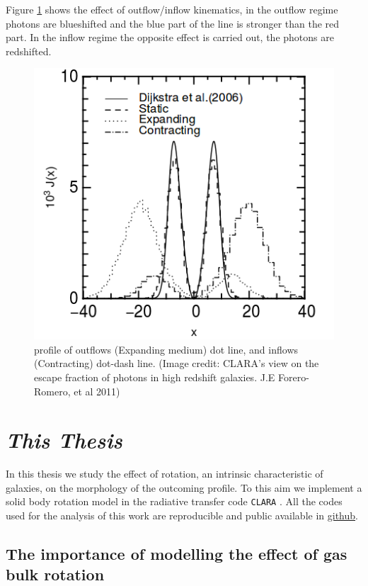 Figure \ref{fig:out} shows the effect of outflow/inflow kinematics, 
in the outflow regime photons are blueshifted and the blue part of the line
is stronger than the red part. In the inflow regime the opposite effect
is carried out, the \ly photons are redshifted. 

\begin{figure}[H]%
\begin{center}
\includegraphics[scale=0.4]{Figures/out.png}
\end{center}\caption{\ly profile of outflows (Expanding medium) dot line, 
and inflows (Contracting) dot-dash line. (Image credit: CLARA's view on the escape fraction of \ly photons in high redshift galaxies. J.E Forero-Romero, et al 2011)\label{fig:out}
 }
\end{figure}

\section{\emph{This Thesis}}

In this thesis we study the effect of rotation, an intrinsic
 characteristic of galaxies, on the morphology
of the \lya outcoming profile. To this aim we implement a solid body
rotation model in the radiative transfer code \verb+CLARA+ \citep{CLARA}.
All the codes used for the analysis of this work are reproducible
and public available in \href{https://github.com/jngaravitoc/RotationLyAlpha}{github}.

\subsection{The importance of modelling the effect of gas bulk rotation}

